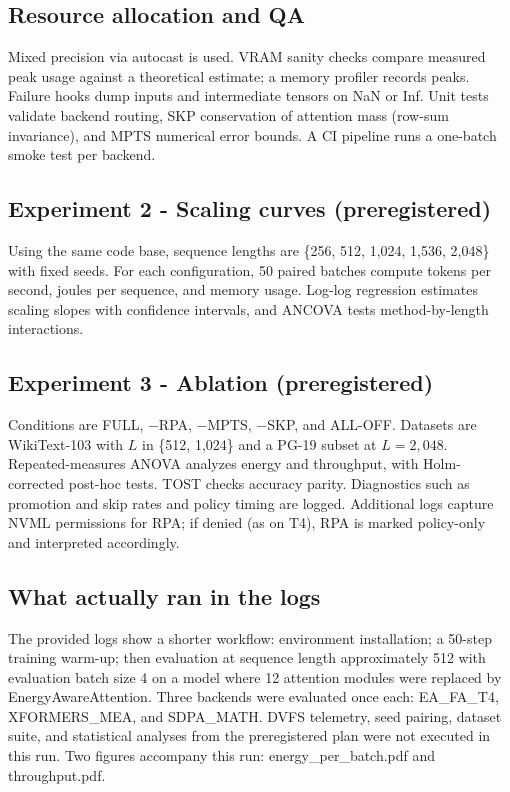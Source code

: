 \documentclass{article}
\begin{document}
\subsection{Resource allocation and QA}
Mixed precision via autocast is used. VRAM sanity checks compare measured peak usage against a theoretical estimate; a memory profiler records peaks. Failure hooks dump inputs and intermediate tensors on NaN or Inf. Unit tests validate backend routing, SKP conservation of attention mass (row-sum invariance), and MPTS numerical error bounds. A CI pipeline runs a one-batch smoke test per backend.

\subsection{Experiment 2 - Scaling curves (preregistered)}
Using the same code base, sequence lengths are \{256, 512, 1,024, 1,536, 2,048\} with fixed seeds. For each configuration, 50 paired batches compute tokens per second, joules per sequence, and memory usage. Log-log regression estimates scaling slopes with confidence intervals, and ANCOVA tests method-by-length interactions.

\subsection{Experiment 3 - Ablation (preregistered)}
Conditions are FULL, \(-\)RPA, \(-\)MPTS, \(-\)SKP, and ALL-OFF. Datasets are WikiText-103 with \(L\) in \{512, 1,024\} and a PG-19 subset at \(L = 2,048\). Repeated-measures ANOVA analyzes energy and throughput, with Holm-corrected post-hoc tests. TOST checks accuracy parity. Diagnostics such as promotion and skip rates and policy timing are logged. Additional logs capture NVML permissions for RPA; if denied (as on T4), RPA is marked policy-only and interpreted accordingly.

\subsection{What actually ran in the logs}
The provided logs show a shorter workflow: environment installation; a 50-step training warm-up; then evaluation at sequence length approximately 512 with evaluation batch size 4 on a model where 12 attention modules were replaced by EnergyAwareAttention. Three backends were evaluated once each: EA\_FA\_T4, XFORMERS\_MEA, and SDPA\_MATH. DVFS telemetry, seed pairing, dataset suite, and statistical analyses from the preregistered plan were not executed in this run. Two figures accompany this run: energy\_per\_batch.pdf and throughput.pdf.
\end{document}
